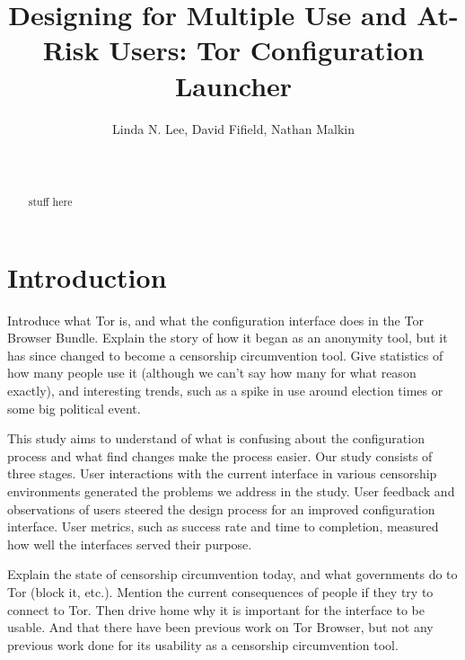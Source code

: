 \documentclass{template}
\begin{document}
\title{Designing for Multiple Use and At-Risk Users: Tor Configuration Launcher}
\author{
 \alignauthor Linda N. Lee, David Fifield, Nathan Malkin \\
   \vspace{0.5em}
    \\
   \\
}
\maketitle

\begin{abstract}
{\color {red} 
stuff here
}
\end{abstract}


\section{Introduction}
{\color {red} 
Introduce what Tor is, and what the configuration interface does in the Tor Browser Bundle. Explain the story of how it began as an anonymity tool, but it has since changed to become a censorship circumvention tool. Give statistics of how many people use it (although we can't say how many for what reason exactly), and interesting trends, such as a spike in use around election times or some big political event. 
}

This study aims to understand of what is confusing about the configuration process and what find changes make the process easier. Our study consists of three stages. User interactions with the current interface in various censorship environments generated the problems we address in the study. User feedback and observations of users steered the design process for an improved configuration interface. User metrics, such as success rate and time to completion, measured how well the interfaces served their purpose. 

{\color {red}
Explain the state of censorship circumvention today, and what governments do to Tor (block it, etc.). Mention the current consequences of people if they try to connect to Tor. Then drive home why it is important for the interface to be usable. And that there have been previous work on Tor Browser, but not any previous work done for its usability as a censorship circumvention tool.
}
\end{document}
